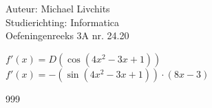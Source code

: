 \documentclass[a4paper]{article}
\begin{document}
  
\noindent \large Auteur: Michael Livchits \\
\noindent \large Studierichting: Informatica\\
\noindent \large Oefeningenreeks 3A nr. 24.20\\

\medskip

\normalsize

$f'(x) = D\left(\cos(4x^2-3x+1)\right)$\\

$f'(x) = -(\sin(4x^2-3x+1))\cdot (8x-3)$\\


\begin{thebibliography}{999}
\end{thebibliography}
\end{document}
